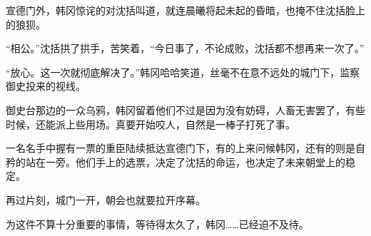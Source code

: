 宣德门外，韩冈惊诧的对沈括叫道，就连晨曦将起未起的昏暗，也掩不住沈括脸上的狼狈。

“相公。”沈括拱了拱手，苦笑着，“今日事了，不论成败，沈括都不想再来一次了。”

“放心。这一次就彻底解决了。”韩冈哈哈笑道，丝毫不在意不远处的城门下，监察御史投来的视线。

御史台那边的一众乌鸦，韩冈留着他们不过是因为没有妨碍，人畜无害罢了，有些时候，还能派上些用场。真要开始咬人，自然是一棒子打死了事。

一名名手中握有一票的重臣陆续抵达宣德门下，有的上来问候韩冈，还有的则是自矜的站在一旁。他们手上的选票，决定了沈括的命运，也决定了未来朝堂上的稳定。

再过片刻，城门一开，朝会也就要拉开序幕。

为这件不算十分重要的事情，等待得太久了，韩冈……已经迫不及待。